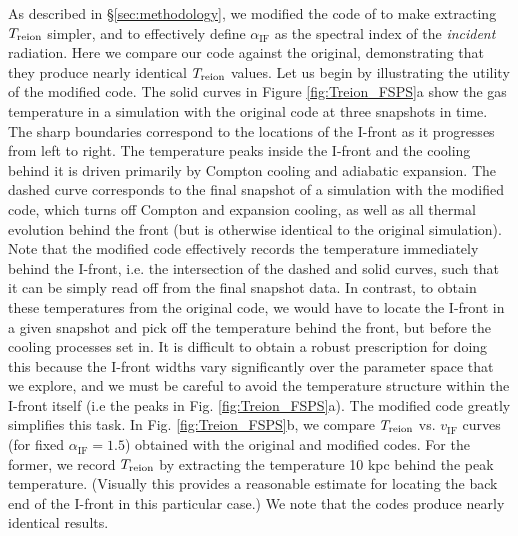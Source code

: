 \documentclass[twocolumn]{aastex62}
\newcommand{\Treion}{T_{\rm reion}}
\newcommand{\vIF}{v_{\mathrm{IF}}}
\newcommand{\spec}{\alpha_{\mathrm{IF}}}
\begin{document}
\begin{appendix}
As described in \S \ref{sec:methodology}, we modified the code of \citet{2016MNRAS.457.3006D} to make extracting $\Treion$ simpler, and to effectively define $\spec$ as the spectral index of the {\it incident} radiation.  Here we compare our code against the original, demonstrating that they produce nearly identical $\Treion$ values.  Let us begin by illustrating the utility of the modified code.  The solid curves in Figure \ref{fig:Treion_FSPS}a show the gas temperature in a simulation with the original code at three snapshots in time.  The sharp boundaries correspond to the locations of the I-front as it progresses from left to right.  The temperature peaks inside the I-front and the cooling behind it is driven primarily by Compton cooling and adiabatic expansion.   The dashed curve corresponds to the final snapshot of a simulation with the modified code, which turns off Compton and expansion cooling, as well as all thermal evolution behind the front (but is otherwise identical to the original simulation).  Note that the modified code effectively records the temperature immediately behind the I-front, i.e. the intersection of the dashed and solid curves, such that it can be simply read off from the final snapshot data.  In contrast, to obtain these temperatures from the original code, we would have to locate the I-front in a given snapshot and pick off the temperature behind the front, but before the cooling processes set in. It is difficult to obtain a robust prescription for doing this because the I-front widths vary significantly over the parameter space that we explore, and we must be careful to avoid the temperature structure within the I-front itself (i.e the peaks in Fig. \ref{fig:Treion_FSPS}a).  The modified code greatly simplifies this task.  In Fig. \ref{fig:Treion_FSPS}b, we compare $\Treion$ vs. $\vIF$ curves (for fixed $\spec=1.5$) obtained with the original and modified codes.  For the former, we record $\Treion$ by extracting the temperature 10 kpc behind the peak temperature. (Visually this provides a reasonable estimate for locating the back end of the I-front in this particular case.)  We note that the codes produce nearly identical results.        


\end{appendix}
\end{document}
